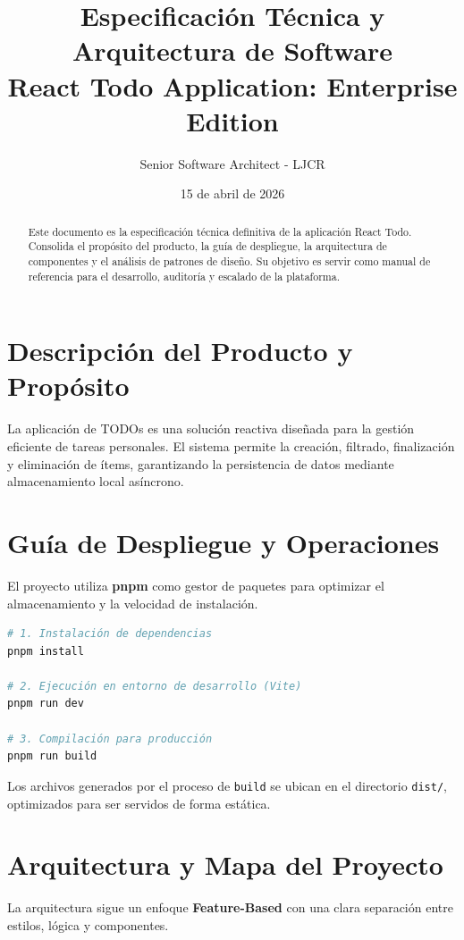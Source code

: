 \documentclass[12pt,a4paper]{article}
\title{Especificación Técnica y Arquitectura de Software\\ \textbf{React Todo Application: Enterprise Edition}}
\author{Senior Software Architect - LJCR}
\date{15 de abril de 2026}
\begin{document}
\maketitle

\begin{abstract}
Este documento es la especificación técnica definitiva de la aplicación React Todo. Consolida el propósito del producto, la guía de despliegue, la arquitectura de componentes y el análisis de patrones de diseño. Su objetivo es servir como manual de referencia para el desarrollo, auditoría y escalado de la plataforma.
\end{abstract}

\tableofcontents
\newpage

\section{Descripción del Producto y Propósito}
La aplicación de TODOs es una solución reactiva diseñada para la gestión eficiente de tareas personales. El sistema permite la creación, filtrado, finalización y eliminación de ítems, garantizando la persistencia de datos mediante almacenamiento local asíncrono.

\section{Guía de Despliegue y Operaciones}
El proyecto utiliza \textbf{pnpm} como gestor de paquetes para optimizar el almacenamiento y la velocidad de instalación.

\begin{lstlisting}[language=bash, caption={Comandos de operación del sistema}]
# 1. Instalación de dependencias
pnpm install

# 2. Ejecución en entorno de desarrollo (Vite)
pnpm run dev

# 3. Compilación para producción
pnpm run build
\end{lstlisting}

Los archivos generados por el proceso de \texttt{build} se ubican en el directorio \texttt{dist/}, optimizados para ser servidos de forma estática.

\section{Arquitectura y Mapa del Proyecto}
La arquitectura sigue un enfoque \textbf{Feature-Based} con una clara separación entre estilos, lógica y componentes.
\end{document}
